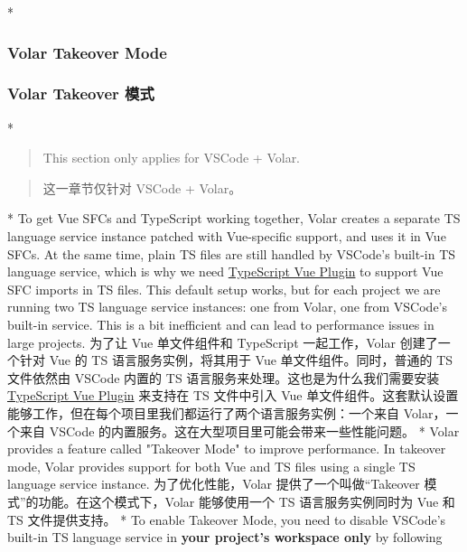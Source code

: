 \begin{paracol}{2} 
 
\switchcolumn[0]*%
\subsubsection{Volar Takeover Mode}
\switchcolumn
\subsubsection{Volar Takeover 模式}
\switchcolumn[0]*%
\begin{quote}
This section only applies for VSCode + Volar.
\end{quote}
\switchcolumn
\begin{quote}
这一章节仅针对 VSCode + Volar。
\end{quote}
\switchcolumn[0]*%
To get Vue SFCs and TypeScript working together, Volar creates a
separate TS language service instance patched with Vue-specific support,
and uses it in Vue SFCs. At the same time, plain TS files are still
handled by VSCode's built-in TS language service, which is why we need
\href{https://marketplace.visualstudio.com/items?itemName=Vue.vscode-typescript-vue-plugin}{TypeScript
Vue Plugin} to support Vue SFC imports in TS files. This default setup
works, but for each project we are running two TS language service
instances: one from Volar, one from VSCode's built-in service. This is a
bit inefficient and can lead to performance issues in large projects.
\switchcolumn
为了让 Vue 单文件组件和 TypeScript 一起工作，Volar 创建了一个针对 Vue 的
TS 语言服务实例，将其用于 Vue 单文件组件。同时，普通的 TS 文件依然由
VSCode 内置的 TS 语言服务来处理。这也是为什么我们需要安装
\href{https://marketplace.visualstudio.com/items?itemName=Vue.vscode-typescript-vue-plugin}{TypeScript
Vue Plugin} 来支持在 TS 文件中引入 Vue
单文件组件。这套默认设置能够工作，但在每个项目里我们都运行了两个语言服务实例：一个来自
Volar，一个来自 VSCode
的内置服务。这在大型项目里可能会带来一些性能问题。
\switchcolumn[0]*%
Volar provides a feature called "Takeover Mode" to improve performance.
In takeover mode, Volar provides support for both Vue and TS files using
a single TS language service instance.
\switchcolumn
为了优化性能，Volar 提供了一个叫做``Takeover
模式''的功能。在这个模式下，Volar 能够使用一个 TS 语言服务实例同时为 Vue
和 TS 文件提供支持。
\switchcolumn[0]*%
To enable Takeover Mode, you need to disable VSCode's built-in TS
language service in \textbf{your project's workspace only} by following

\end{paracol}
